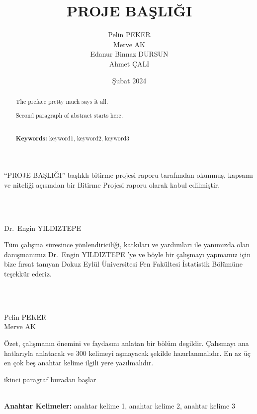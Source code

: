 \documentclass[12pt,twoside]{deuthesis}
\title{PROJE BAŞLIĞI}
\author{Pelin PEKER \\ Merve AK \\ Edanur Binnaz DURSUN \\ Ahmet ÇALI} %
\date{Şubat 2024}
\begin{document}
  \maketitle

\frontmatter %
\pagestyle{empty} %
\begin{preface}
	``PROJE BAŞLIĞI'' başlıklı bitirme projesi raporu tarafımdan okunmuş, kapsamı ve niteliği açısından bir Bitirme Projesi raporu olarak kabul edilmiştir.\\
\strut \\
\strut \\
Dr.~Engin YILDIZTEPE
\end{preface}
  \begin{acknowledgements}
    Tüm çalışma süresince yönlendiriciliği, katkıları ve yardımları ile yanımızda olan danışmanımız Dr.~Engin YILDIZTEPE 'ye ve böyle bir çalışmayı yapmamız için bize fırsat tanıyan Dokuz Eylül Üniversitesi Fen Fakültesi İstatistik Bölümüne teşekkür ederiz.\\
    \strut \\
    \strut \\
    Pelin PEKER\\
    Merve AK\\
  \end{acknowledgements}
\begin{abstractTR}
	Özet, çalışmanın önemini ve faydasını anlatan bir bölüm degildir. Çalısmayı ana
hatlarıyla anlatacak ve 300 kelimeyi aşmayacak şekilde hazırlanmalıdır. En az üç en
çok beş anahtar kelime ilgili yere yazılmalıdır.

\par

ikinci paragraf buradan başlar\\
\strut \\
\textbf{Anahtar Kelimeler:} anahtar kelime 1, anahtar kelime 2, anahtar kelime 3
\end{abstractTR}
\begin{abstract}
	The preface pretty much says it all.

\par

Second paragraph of abstract starts here.\\
\strut \\
\textbf{Keywords:} keyword1, keyword2, keyword3
\end{abstract}
\end{document}
